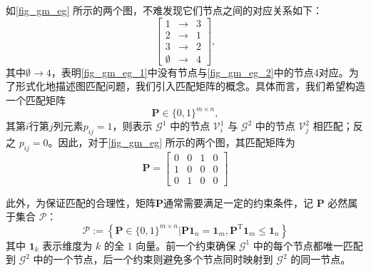 如\cref{fig_gm_eg} 所示的两个图，不难发现它们节点之间的对应关系如下：
\[
    \begin{bmatrix}
        1         & \to & 3 \\
        2         & \to & 1 \\
        3         & \to & 2 \\
        \emptyset & \to & 4
    \end{bmatrix},
\]
其中\( \emptyset \to 4 \)，表明\cref{fig_gm_eg_1}中没有节点与\cref{fig_gm_eg_2}中的节点4对应。为了形式化地描述图匹配问题，我们引入匹配矩阵的概念。具体而言，我们希望构造一个匹配矩阵
\[
    \mathbf{P} \in \{0,1\}^{m \times n},
\]
其第\( i \)行第\( j \)列元素$p_{ij}=1$，则表示 $\mathcal G^1$ 中的节点 $\mathcal V^1_i$ 与 $\mathcal G^2$ 中的节点 $\mathcal V^2_j$ 相匹配；反之 $p_{ij}=0$。因此，对于\cref{fig_gm_eg} 所示的两个图，其匹配矩阵为
\[
    \mathbf{P} =
    \begin{bmatrix}
        0 & 0 & 1 & 0 \\
        1 & 0 & 0 & 0 \\
        0 & 1 & 0 & 0
    \end{bmatrix}
\]

此外，为保证匹配的合理性，矩阵\( \mathbf{P} \)通常需要满足一定的约束条件，记 $\mathbf{P}$ 必然属于集合 $\mathcal{P}$：
\[
    \mathcal{P} := \left\{ \mathbf{P} \in \{0,1\}^{m \times n} | \mathbf{P} \mathbf{1}_n = \mathbf{1}_m, \mathbf{P}^{\mathrm{T}} \mathbf{1}_m \leq \mathbf{1}_n \right\}
\]
其中 $\mathbf{1}_k$ 表示维度为 $k$ 的全 $1$ 向量。前一个约束确保 $\mathcal G^1$ 中的每个节点都唯一匹配到 $\mathcal G^2$ 中的一个节点，后一个约束则避免多个节点同时映射到 $\mathcal G^2$ 的同一节点。


